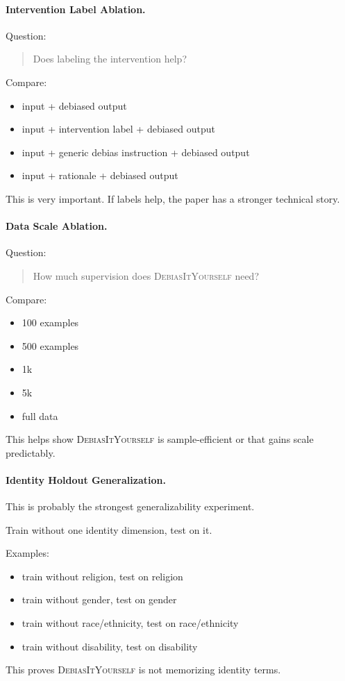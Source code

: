 \documentclass[11pt]{article}
\newcommand{\diy}{\textsc{DebiasItYourself}}
\begin{document}
\paragraph{Intervention Label Ablation.}
Question:
\begin{quote}
Does labeling the intervention help?
\end{quote}

Compare:
\begin{itemize}[leftmargin=1.4em,itemsep=1pt,topsep=2pt]
    \item input + debiased output
    \item input + intervention label + debiased output
    \item input + generic debias instruction + debiased output
    \item input + rationale + debiased output
\end{itemize}
This is very important. If labels help, the paper has a stronger technical story.

\paragraph{Data Scale Ablation.}
Question:
\begin{quote}
How much supervision does \diy{} need?
\end{quote}

Compare:
\begin{itemize}[leftmargin=1.4em,itemsep=1pt,topsep=2pt]
    \item 100 examples
    \item 500 examples
    \item 1k
    \item 5k
    \item full data
\end{itemize}
This helps show \diy{} is sample-efficient or that gains scale predictably.

\paragraph{Identity Holdout Generalization.}
This is probably the strongest generalizability experiment.

Train without one identity dimension, test on it.

Examples:
\begin{itemize}[leftmargin=1.4em,itemsep=1pt,topsep=2pt]
    \item train without religion, test on religion
    \item train without gender, test on gender
    \item train without race/ethnicity, test on race/ethnicity
    \item train without disability, test on disability
\end{itemize}
This proves \diy{} is not memorizing identity terms.
\end{document}
